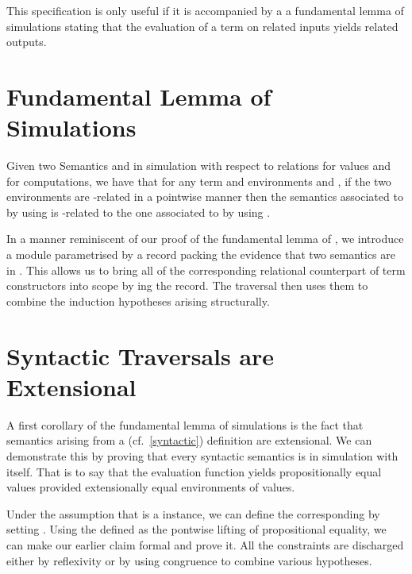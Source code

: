 
This specification is only useful if it is accompanied by a a fundamental lemma of
simulations stating that the evaluation of a term on related inputs yields related
outputs.

\section{Fundamental Lemma of Simulations}

Given two Semantics  and  in simulation with respect to relations
 for values and  for computations, we have that for any term 
and environments  and , if the two environments are -related
in a pointwise manner then the semantics associated to  by  using 
is -related to the one associated to  by  using .

In a manner reminiscent of our proof of the fundamental lemma of , we
introduce a  module parametrised by a record packing the evidence
that two semantics are in . This allows us to bring all of the
corresponding relational counterpart of term constructors into scope by ing
the record. The traversal then uses them to combine the induction hypotheses arising
structurally.



\section{Syntactic Traversals are Extensional}

A first corollary of the fundamental lemma of simulations is the fact that semantics
arising from a  (cf.~\cref{syntactic}) definition are extensional. We
can demonstrate this by proving that every syntactic semantics is in simulation with
itself. That is to say that the evaluation function yields propositionally equal
values provided extensionally equal environments of values.

Under the assumption that  is a  instance, we can define the
corresponding   by setting
.
Using  the  defined as the pontwise lifting of propositional equality,
we can make our earlier claim formal and prove it. All the constraints are discharged
either by reflexivity or by using congruence to combine various hypotheses.

